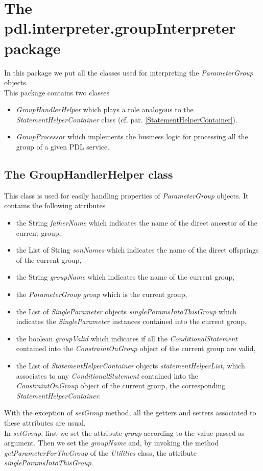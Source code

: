 \documentclass[a4paper,11pt] {ivoa}
\begin{document}
\section{The pdl.interpreter.groupInterpreter package}
In this package we put all the classes used for interpreting the {\it ParameterGroup} objects.\\
This package contains two classes
\begin{itemize}
\item {\it GroupHandlerHelper} which plays a role analogous to the {\it StatementHelperContainer} class (cf. par. \ref{StatementHelperContainer}).
\item {\it GroupProcessor} which implements the business logic for processing all the group of a given PDL service.
\end{itemize}

\subsection{The GroupHandlerHelper class}\label{GroupHandlerHelper}
This class is used for easily handling properties of {\it ParameterGroup} objects. It contains the following attributes
\begin{itemize}
\item the String {\it fatherName} which indicates the name of the direct ancestor of the current group,
\item the List of String {\it sonNames} which indicates the name of the direct offsprings of the current group,
\item the String {\it groupName} which indicates the name of the current group,
\item the {\it ParameterGroup} {\it group} which is the current group,
\item the List of {\it SingleParameter} objects {\it singleParamsIntoThisGroup} which indicates the {\it SingleParameter} instances contained into the current group, 
\item the boolean {\it groupValid} which indicates if all the {\it ConditionalStatement} contained into the {\it ConstraintOnGroup} object of the current group are valid,
\item the List of {\it StatementHelperContainer} objects {\it statementHelperList}, which associates to any {\it ConditionalStatement} contained into the {\it ConstraintOnGroup} object of the current group, the corresponding  {\it StatementHelperContainer}.
\end{itemize}
With the exception of {\it setGroup} method, all the getters and setters associated to these attributes are usual.\\ 
In {\it setGroup}, first we set the attribute {\it group} according to the value passed as argument. Then we set  the {\it groupName} and, by invoking the method {\it getParameterForTheGroup} of  the {\it Utilities} class, the attribute {\it singleParamsIntoThisGroup}.
\end{document}
